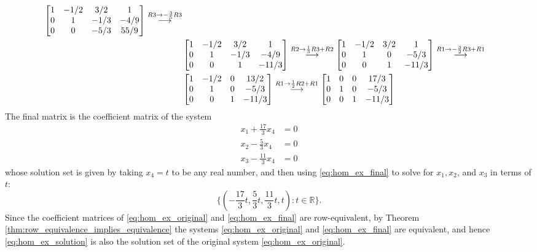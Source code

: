 \documentclass[12pt,letterpaper,reqno]{article}
\numberwithin{equation}{section}
\begin{document}
\begin{example}
\begin{align*}
{\begin{bmatrix}
		1&-1/2&3/2&1 \\ 0 & 1 & -1/3 & -4/9 \\0&0&-5/3&55/9
	\end{bmatrix} }\stackrel{\footnotesize{R3 \to -\frac{3}{5}R3}}{\longrightarrow} \\
	&\begin{bmatrix}
		1&-1/2&3/2&1 \\ 0 & 1 & -1/3 & -4/9 \\0&0&1&-11/3
	\end{bmatrix} \stackrel{\footnotesize{R2 \to \frac{1}{3}R3+R2}}{\longrightarrow}\begin{bmatrix}
		1&-1/2&3/2&1 \\ 0 & 1 & 0 & -5/3 \\0&0&1&-11/3
	\end{bmatrix}\stackrel{\footnotesize{R1 \to -\frac{3}{2}R3+R1}}{\longrightarrow}\\
	&\begin{bmatrix}
		1&-1/2&0&13/2 \\ 0 & 1 & 0 & -5/3 \\0&0&1&-11/3
	\end{bmatrix}\stackrel{\footnotesize{R1 \to \frac{1}{2}R2+R1}}{\longrightarrow}\begin{bmatrix}
		1&0&0&17/3 \\ 0 & 1 & 0 & -5/3 \\0&0&1&-11/3
	\end{bmatrix}
\end{align*}
The final matrix is the coefficient matrix of the system
\begin{equation} \label{eq:hom_ex_final}
\begin{split}
	x_1+\frac{17}{3}x_4&=0 \\
	x_2-\frac{5}{3}x_4&=0 \\
	x_3-\frac{11}{3}x_4&=0
\end{split}
\end{equation}
whose solution set is given by taking $x_4=t$ to be any real number, and then using \eqref{eq:hom_ex_final} to solve for $x_1,x_2$, and $x_3$ in terms of $t$:
\begin{equation}\label{eq:hom_ex_solution}
\{(-\frac{17}{3}t,\frac{5}{3}t,\frac{11}{3}t,t):t \in \mathbb{R}\}.	
\end{equation}
 Since the coefficient matrices of \eqref{eq:hom_ex_original} and \eqref{eq:hom_ex_final} are row-equivalent, by Theorem \ref{thm:row_equivalence_implies_equivalence} the systems \eqref{eq:hom_ex_original} and \eqref{eq:hom_ex_final} are equivalent, and hence \eqref{eq:hom_ex_solution} is also the solution set of the original system \eqref{eq:hom_ex_original}.
\end{example}
\end{document}
